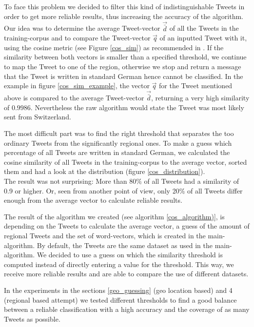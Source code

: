 \documentclass[../Main.tex]{subfiles}
\begin{document}
To face this problem we decided to filter this kind of indistinguishable Tweets in order to get more reliable results, thus increasing the accuracy of the algorithm. \\
Our idea was to determine the average Tweet-vector $\vec{\bar{d}}$ of all the Tweets in the training-corpus and to compare the Tweet-vector $\vec{q}$ of an inputted Tweet with it, using the cosine metric (see Figure \ref{cos_sim}) as recommended in \cite[805]{SaLP}. If the similarity between both vectors is smaller than a specified threshold, we continue to map the Tweet to one of the region, otherwise we stop and return a message that the Tweet is written in standard German hence cannot be classified. In the example in figure \ref{cos_sim_example}, the vector $\vec{q}$ for the Tweet mentioned above is compared to the average Tweet-vector $\vec{\bar{d}}$, returning a very high similarity of $0.9986$. Nevertheless the raw algorithm would state the Tweet was most likely sent from Switzerland.

The most difficult part was to find the right threshold that separates the too ordinary Tweets from the significantly regional ones. To make a guess which percentage of all Tweets are written in standard German, we calculated the cosine similarity of all Tweets in the training-corpus to the average vector, sorted them and had a look at the distribution (figure \ref{cos_distribution}). \\
The result was not surprising: More than 80\% of all Tweets had a similarity of 0.9 or higher. Or, seen from another point of view, only 20\% of all Tweets differ enough from the average vector to calculate reliable results.

The result of  the algorithm we created (see algorithm \ref{cos_algorithm)}, is depending on the Tweets to calculate the average vector, a guess of the amount of regional Tweets and the set of word-vectors,  which is created in the main-algorithm. By default, the Tweets are the same dataset as used in the main-algorithm. We decided to use a guess on which the similarity threshold is computed instead of directly entering a value for the threshold. This way, we receive more reliable results and are able to compare the use of different datasets.

In the experiments in the sections \ref{geo_guessing} (geo location based) and 4 (regional based attempt) we tested different thresholds to find a good balance between a reliable classification with a high accuracy and the coverage of as many Tweets as possible.\\
\end{document}
